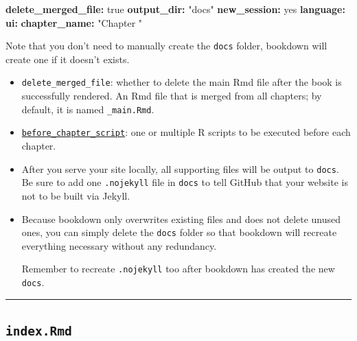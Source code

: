 \documentclass[
  a4paper,
  twoside,
  openright]{book}
\newenvironment{Shaded}{\begin{snugshade}}{\end{snugshade}}
\newcommand{\AttributeTok}[1]{\textcolor[rgb]{0.13,0.29,0.53}{#1}}
\newcommand{\CharTok}[1]{\textcolor[rgb]{0.31,0.60,0.02}{#1}}
\newcommand{\FunctionTok}[1]{\textcolor[rgb]{0.13,0.29,0.53}{\textbf{#1}}}
\newcommand{\KeywordTok}[1]{\textcolor[rgb]{0.13,0.29,0.53}{\textbf{#1}}}
\newcommand{\StringTok}[1]{\textcolor[rgb]{0.31,0.60,0.02}{#1}}
\theoremstyle{definition}
\theoremstyle{definition}
\theoremstyle{definition}
\theoremstyle{definition}
\theoremstyle{remark}
\begin{document}
\begin{Shaded}
\begin{Highlighting}[]
\FunctionTok{delete\_merged\_file}\KeywordTok{:}\AttributeTok{ }\CharTok{true}
\FunctionTok{output\_dir}\KeywordTok{:}\AttributeTok{ }\StringTok{"docs"}
\FunctionTok{new\_session}\KeywordTok{:}\AttributeTok{ }\CharTok{yes}
\FunctionTok{language}\KeywordTok{:}
\AttributeTok{  }\FunctionTok{ui}\KeywordTok{:}
\AttributeTok{    }\FunctionTok{chapter\_name}\KeywordTok{:}\AttributeTok{ }\StringTok{"Chapter "}
\end{Highlighting}
\end{Shaded}

Note that you don't need to manually create the \texttt{docs} folder, bookdown will create one if it doesn't exists.

\begin{itemize}
\item
  \texttt{delete\_merged\_file}: whether to delete the main Rmd file after the book is successfully rendered. An Rmd file that is merged from all chapters; by default, it is named \texttt{\_main.Rmd}.
\item
  \href{https://github.com/rstudio/bookdown/issues/1252\#issuecomment-913530117}{\texttt{before\_chapter\_script}}: one or multiple R scripts to be executed before each chapter.
\item
  After you serve your site locally, all supporting files will be output to \texttt{docs}. Be sure to add one \texttt{.nojekyll} file in \texttt{docs} to tell GitHub that your website is not to be built via Jekyll.
\item
  Because bookdown only overwrites existing files and does not delete unused ones, you can simply delete the \texttt{docs} folder so that bookdown will recreate everything necessary without any redundancy.

  Remember to recreate \texttt{.nojekyll} too after bookdown has created the new \texttt{docs}.
\end{itemize}

\begin{center}\rule{0.5\linewidth}{0.5pt}\end{center}

\subsection*{\texorpdfstring{\texttt{index.Rmd}}{index.Rmd}}\label{index.rmd}
\end{document}
